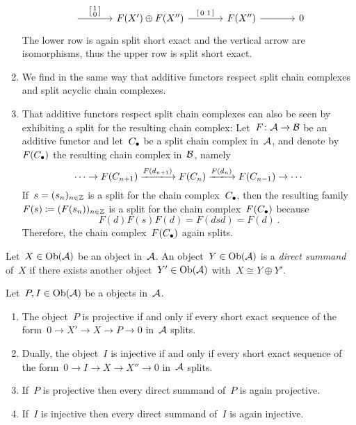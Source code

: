 \begin{remark*}
\begin{enumerate}
\[\begin{tikzcd}[ampersand replacement = \&, column sep = large]
              \arrow{r}[above]{\begin{bsmallmatrix} 1 \\ 0 \end{bsmallmatrix}}
          \&  F(X') \oplus F(X'')
              \arrow{r}[above]{{\begin{bsmallmatrix} 0 & 1 \end{bsmallmatrix}}}
          \&  F(X'')
              \arrow{r}
          \&  0
        \end{tikzcd}
      \]
      The lower row is again split short exact and the vertical arrow are isomorphisms, thus the upper row is split short exact.
    \item
      We find in the same way that additive functors respect split chain complexes and split acyclic chain complexes.
    \item
      That additive functors respect split chain complexes can also be seen by exhibiting a split for the resulting chain complex:
      Let~$F \colon \mathcal{A} \to \mathcal{B}$ be an additive functor and let~$C_\bullet$ be a split chain complex in~$\mathcal{A}$, and denote by~$F(C_\bullet)$ the resulting chain complex in~$\mathcal{B}$, namely
      \[
        \dotsb
        \to
        F(C_{n+1})
        \xlongto{F(d_{n+1})}
        F(C_n)
        \xlongto{F(d_n)}
        F(C_{n-1})
        \to
        \dotsb
      \]
      If~$s = (s_n)_{n \in \mathbb{Z}}$ is a split for the chain complex~$C_\bullet$, then the resulting family~$F(s) \coloneqq (F(s_n))_{n \in \mathbb{Z}}$ is a split for the chain complex~$F(C_\bullet)$ because
      \[
        F(d) F(s) F(d)
        =
        F(dsd)
        =
        F(d) \,.
      \]
      Therefore, the chain complex~$F(C_\bullet)$ again splits.
  \end{enumerate}
\end{remark*}


\begin{definition*}
  Let~$X \in \operatorname{Ob}(\mathcal{A})$ be an object in~$\mathcal{A}$.
  An object~$Y \in \operatorname{Ob}(\mathcal{A})$ is a \emph{direct summand} of~$X$ if there exists another object~$Y' \in \operatorname{Ob}(\mathcal{A})$ with~$X \cong Y \oplus Y'$.
\end{definition*}


\begin{lemma}
  Let~$P, I \in \operatorname{Ob}(\mathcal{A})$ be a objects in~$\mathcal{A}$.
  \begin{enumerate}
    \item
      \label{ses ending in projective}
      The object~$P$ is projective if and only if every short exact sequence of the form~$0 \to X' \to X \to P \to 0$ in~$\mathcal{A}$ splits.
    \item
      Dually, the object~$I$ is injective if and only if every short exact sequence of the form~$0 \to I \to X \to X'' \to 0$ in~$\mathcal{A}$ splits.
    \item
      \label{direct summand of projective}
      If~$P$ is projective then every direct summand of~$P$ is again projective.
    \item
      If~$I$ is injective then every direct summand of~$I$ is again injective.
  \end{enumerate}
\end{lemma}


